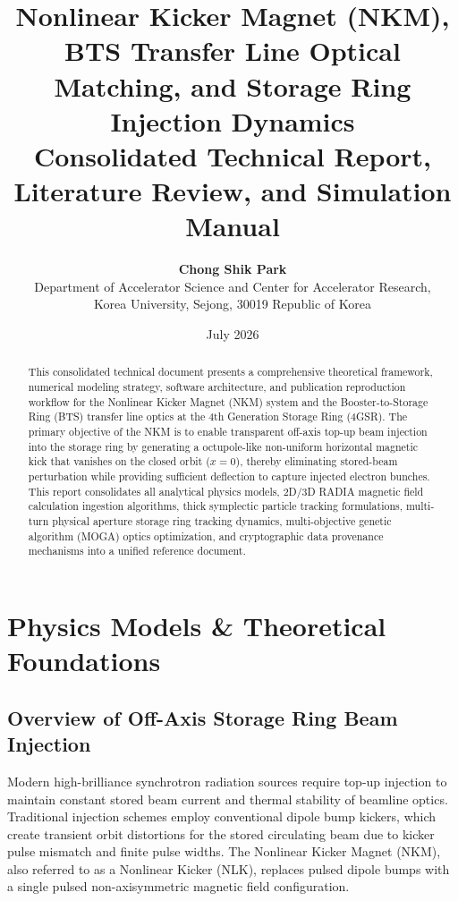 \documentclass[11pt,a4paper]{article}
\title{\textbf{Nonlinear Kicker Magnet (NKM), BTS Transfer Line Optical Matching, and Storage Ring Injection Dynamics}\\
\large Consolidated Technical Report, Literature Review, and Simulation Manual}
\author{\textbf{Chong Shik Park}\\[0.5em]
Department of Accelerator Science and Center for Accelerator Research,\\
Korea University, Sejong, 30019 Republic of Korea}
\date{July 2026}
\begin{document}
\maketitle

\begin{abstract}
This consolidated technical document presents a comprehensive theoretical framework, numerical modeling strategy, software architecture, and publication reproduction workflow for the Nonlinear Kicker Magnet (NKM) system and the Booster-to-Storage Ring (BTS) transfer line optics at the 4th Generation Storage Ring (4GSR). The primary objective of the NKM is to enable transparent off-axis top-up beam injection into the storage ring by generating a octupole-like non-uniform horizontal magnetic kick that vanishes on the closed orbit ($x=0$), thereby eliminating stored-beam perturbation while providing sufficient deflection to capture injected electron bunches. This report consolidates all analytical physics models, 2D/3D RADIA magnetic field calculation ingestion algorithms, thick symplectic particle tracking formulations, multi-turn physical aperture storage ring tracking dynamics, multi-objective genetic algorithm (MOGA) optics optimization, and cryptographic data provenance mechanisms into a unified reference document.
\end{abstract}

\tableofcontents
\newpage

\section{Physics Models \& Theoretical Foundations}

\subsection{Overview of Off-Axis Storage Ring Beam Injection}
Modern high-brilliance synchrotron radiation sources require top-up injection to maintain constant stored beam current and thermal stability of beamline optics. Traditional injection schemes employ conventional dipole bump kickers, which create transient orbit distortions for the stored circulating beam due to kicker pulse mismatch and finite pulse widths. The Nonlinear Kicker Magnet (NKM), also referred to as a Nonlinear Kicker (NLK), replaces pulsed dipole bumps with a single pulsed non-axisymmetric magnetic field configuration.
\end{document}
